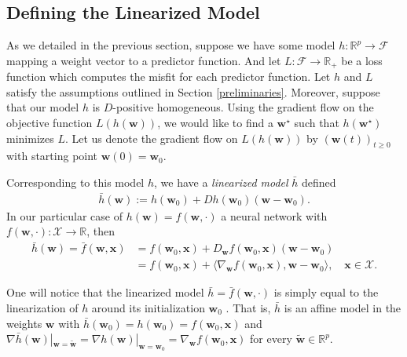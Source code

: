 \documentclass{article}
\begin{document}
\subsection{Defining the Linearized Model}
As we detailed in the previous section, suppose we have some model $h: \mathbb{R}^p \rightarrow \mathcal{F}$ mapping a weight vector to a predictor function. And let $L: \mathcal{F} \rightarrow \mathbb{R}_+$ be a loss function which computes the misfit for each predictor function. Let $h$ and $L$ satisfy the assumptions outlined in Section \ref{preliminaries}. Moreover, suppose that our model $h$ is $D$-positive homogeneous. Using the gradient flow on the objective function $L(h(\boldsymbol{w}))$, we would like to find a $\boldsymbol{w}^{\star}$ such that $h(\boldsymbol{w}^{\star})$ minimizes $L$. Let us denote the gradient flow on $L(h(\boldsymbol{w}))$ by $(\boldsymbol{w}(t))_{t \geq 0}$ with starting point $\boldsymbol{w}(0) = \boldsymbol{w}_0$.

Corresponding to this model $h$, we have a \textit{linearized model} $\bar{h}$ defined
\begin{align}
    \bar{h}(\boldsymbol{w}) := h(\boldsymbol{w}_0) + Dh(\boldsymbol{w}_0)(\boldsymbol{w}-\boldsymbol{w}_0).\label{linearizedmodel}
\end{align}
In our particular case of $h(\boldsymbol{w}) = f(\boldsymbol{w}, \cdot)$ a neural network with $f(\boldsymbol{w}, \cdot): \mathcal{X} \rightarrow \mathbb{R}$, then
\begin{align}
    \bar{h}(\boldsymbol{w}) = \bar{f}(\boldsymbol{w}, \boldsymbol{x}) &=  f(\boldsymbol{w}_0, \boldsymbol{x}) + D_{\boldsymbol{w}}f(\boldsymbol{w}_0, \boldsymbol{x})(\boldsymbol{w}-\boldsymbol{w}_0) \nonumber\\ 
    &= f(\boldsymbol{w}_0, \boldsymbol{x}) + \langle \nabla_{\boldsymbol{w}} f(\boldsymbol{w}_0, \boldsymbol{x}), \boldsymbol{w}-\boldsymbol{w}_0\rangle, \quad \boldsymbol{x} \in \mathcal{X}.\label{linearizedmodelnetwork}
\end{align}

One will notice that the linearized model $\bar{h} = \bar{f}(\boldsymbol{w}, \cdot)$ is simply equal to the linearization of $h$ around its initialization $\boldsymbol{w}_0$ \cite{chizat2018lazy}. That is, $\bar{h}$ is an affine model in the weights $\boldsymbol{w}$ with $\bar{h}(\boldsymbol{w}_0) = h(\boldsymbol{w}_0) = f(\boldsymbol{w}_0, \boldsymbol{x})$ and $\nabla \bar{h}(\boldsymbol{w})|_{\boldsymbol{w} = \boldsymbol{\tilde{w}}} = \nabla h(\boldsymbol{w})|_{\boldsymbol{w} = \boldsymbol{w}_0} = \nabla_{\boldsymbol{w}} f(\boldsymbol{w}_0, \boldsymbol{x})$ for every $\boldsymbol{\tilde{w}} \in \mathbb{R}^p$.
\end{document}
